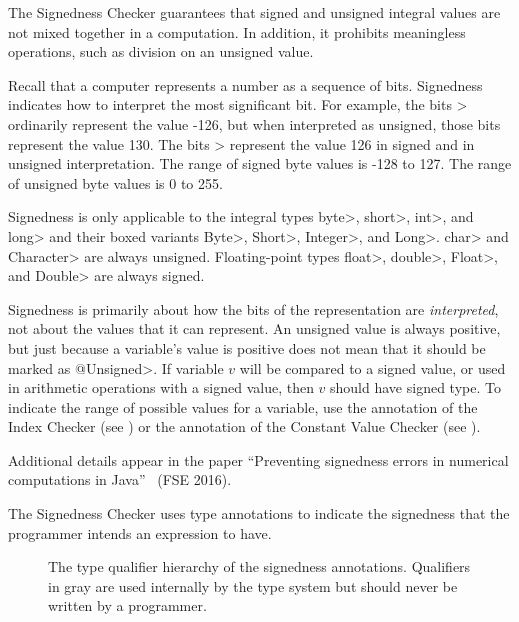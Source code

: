 \htmlhr
{}

The Signedness Checker guarantees that signed and unsigned integral values are not mixed
together in a computation. In addition, it prohibits meaningless operations, such
as division on an unsigned value.

Recall that a computer represents a number as a sequence of bits.
Signedness indicates how to interpret the most significant bit.  For
example, the bits > ordinarily represent the value -126, but when
interpreted as unsigned, those bits represent the value 130.  The bits
> represent the value 126 in signed and in unsigned interpretation.
The range of signed byte values is -128 to 127.  The range of unsigned byte
values is 0 to 255.

Signedness is only applicable to the integral types \<byte>,
\<short>, \<int>, and \<long> and their boxed variants \<Byte>,
\<Short>, \<Integer>, and \<Long>.
\<char> and \<Character> are always unsigned.
Floating-point types \<float>, \<double>, \<Float>, and \<Double> are always signed.

Signedness is primarily about how the bits of the representation are
\emph{interpreted}, not about the values that it can represent.  An unsigned value
is always positive, but just because a variable's value is positive does
not mean that it should be marked as \<@Unsigned>.  If variable $v$ will be
compared to a signed value, or used in arithmetic operations with a signed
value, then $v$ should have signed type.
To indicate the range of possible values for a variable, use the
 annotation of the Index
Checker (see ) or the
 annotation of the Constant Value
Checker (see ).

Additional details appear in the paper
``Preventing signedness errors in numerical computations in
Java''~\cite{Mackie2016} (FSE 2016).



The Signedness Checker uses type annotations to indicate the signedness that the programmer intends an expression to have.

\begin{figure}
\caption{The type qualifier hierarchy of the signedness annotations.
Qualifiers in gray are used internally by the type system but should never be written by a programmer.}
\label{fig-signedness-hierarchy}
\end{figure}

